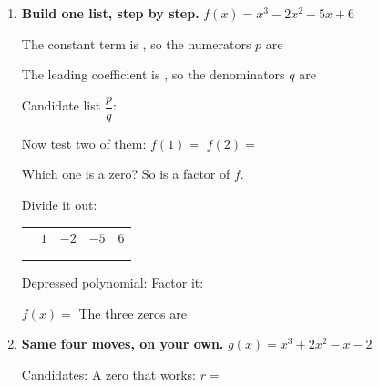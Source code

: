 \documentclass[10pt]{article}
\begin{document}
\begin{tcolorbox}[colback=white, colframe=black!40, title=\textbf{Tier R --- Remediate},
    fonttitle=\bfseries, arc=1.5mm, left=3mm, right=3mm, top=2mm, bottom=2mm, breakable]
\begin{enumerate}[leftmargin=1.7em, itemsep=9pt]
  \item \textbf{Build one list, step by step.} $f(x) = x^3 - 2x^2 - 5x + 6$

    \vspace{2pt}
    The constant term is , so the numerators $p$ are 

    \vspace{2pt}
    The leading coefficient is , so the denominators $q$ are 

    \vspace{2pt}
    Candidate list $\dfrac{p}{q}$: 

    \vspace{3pt}
    Now test two of them: \; $f(1) = $  \qquad $f(2) = $ 

    \vspace{2pt}
    Which one is a zero?  \; So  is a factor of $f$.

    \vspace{3pt}
    Divide it out:
    \begin{center}
    \renewcommand{\arraystretch}{1.6}
    \begin{tabular}{r|C{1.4cm}C{1.4cm}C{1.4cm}C{1.4cm}}
     & $1$ & $-2$ & $-5$ & $6$ \\
        &     &  &  &  \\ 
        &  &  &  &  \\
    \end{tabular}
    \end{center}

    \vspace{2pt}
    Depressed polynomial:  \; Factor it: 

    \vspace{2pt}
    $f(x) = $  \qquad The three zeros are 

  \item \textbf{Same four moves, on your own.} $g(x) = x^3 + 2x^2 - x - 2$

    \vspace{2pt}
    Candidates:  \qquad A zero that works: $r = $ 


\end{enumerate}
\end{tcolorbox}
\end{document}
